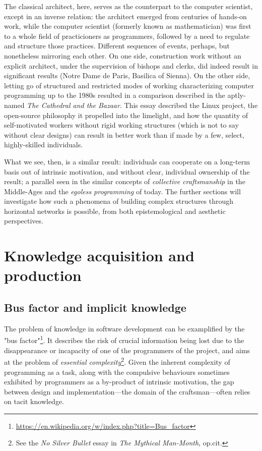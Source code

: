 \documentclass{article}
\begin{document}
The classical architect, here, serves as the counterpart to the computer scientist, except in an inverse relation: the architect emerged from centuries of hands-on work, while the computer scientist (formerly known as mathematician) was first to a whole field of practicioners as programmers, followed by a need to regulate and structure those practices. Different sequences of events, perhaps, but nonetheless mirroring each other. On one side, construction work without an explicit architect, under the supervision of bishops and clerks, did indeed result in significant results (Notre Dame de Paris, Basilica of Sienna). On the other side, letting go of structured and restricted modes of working characterizing computer programming up to the 1980s resulted in a comparison described in the aptly-named \textit{The Cathedral and the Bazaar}. This essay described the Linux project, the open-source philosophy it propelled into the limelight, and how the quantity of self-motivated workers without rigid working structures (which is not to say without clear designs) can result in better work than if made by a few, select, highly-skilled individuals\cite{raymond_cathedral_2001,henningsen_joys_2020}.

What we see, then, is a similar result: individuals can cooperate on a long-term basis out of intrinsic motivation, and without clear, individual ownership of the result; a parallel seen in the similar concepts of \textit{collective craftsmanship} in the Middle-Ages and the \emph{egoless programming} of today\cite{brooks_mythical_1975}. The further sections will investigate how such a phenomena of building complex structures through horizontal networks is possible, from both epistemological and aesthetic perspectives.

\section{Knowledge acquisition and production}

\subsection{Bus factor and implicit knowledge}

The problem of knowledge in software development can be examplified by the "bus factor"\footnote{\url{https://en.wikipedia.org/w/index.php?title=Bus_factor}}. It describes the risk of crucial information being lost due to the disappearance or incapacity of one of the programmers of the project, and aims at the problem of \emph{essential complexity}\footnote{See the \textit{No Silver Bullet} essay in \emph{The Mythical Man-Month}, op.cit.}. Given the inherent complexity of programming as a task, along with the compulsive behaviours sometimes exhibited by programmers as a by-product of intrinsic motivation\cite{weizenbaum_computer_1976}, the gap between design and implementation---the domain of the craftsman---often relies on tacit knowledge\cite{collins_tacit_2010}.
\end{document}
